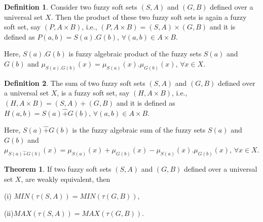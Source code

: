 \documentclass{article}
\theoremstyle{definition}
\newtheorem{theorem}{Theorem}[section]
\newtheorem{definition}{Definition}[section]
\begin{document}
\begin{definition}
    Consider two fuzzy soft sets  $(S, A)$ and $(G, B)$ defined over a  universal set $X$. Then the product of these two fuzzy soft sets is again a fuzzy soft set, say $(P, A\times B) $, i.e., $(P, A\times B)=(S,A) \times (G,B)$ and it is defined as $P(a, b)= S(a).G(b)$, $\forall (a, b) \in A\times B$.

    Here, $S(a).G(b)$ is fuzzy algebraic product of the fuzzy sets $S(a)$ and $G(b)$ and $\mu_{S(a).G(b)}(x)= {\mu_{S(a)}(x)}.{\mu_{G(b)}(x)}$, $\forall x \in X$.
\end{definition}

\begin{definition}
      The sum of two fuzzy soft sets $(S, A)$ and $(G, B)$ defined over a universal set $X$, is a fuzzy soft set, say $(H, A\times B) $, i.e., $(H, A\times B)=(S,A) + (G,B)$ and it is defined as $H(a, b)= S(a) \hat{+} G(b)$, $\forall (a, b) \in A\times B$.

    Here, $S(a)\hat{+} G(b)$ is the fuzzy algebraic sum of the fuzzy sets $S(a)$ and $G(b)$ and $\mu_{S(a)\hat{+} G(b)}(x)= {\mu_{S(a)}(x)}+{\mu_{G(b)}(x)}- {\mu_{S(a)}(x)}.{\mu_{G(b)}(x)}$, $\forall x \in X$.
\end{definition}

\begin{theorem}
    If two fuzzy soft sets $(S, A)$ and $(G, B)$ defined over a universal set $X$, are weakly equivalent, then

(i) $MIN(\tau(S,A))=MIN(\tau(G,B))$,

(ii)$MAX(\tau(S,A))=MAX(\tau(G,B))$.
\end{theorem}
        
\end{document}
